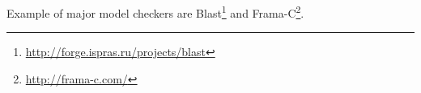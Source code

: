   


Example of major model checkers are Blast\footnote{\url{http://forge.ispras.ru/projects/blast}} and Frama-C\footnote{\url{http://frama-c.com/}}.

